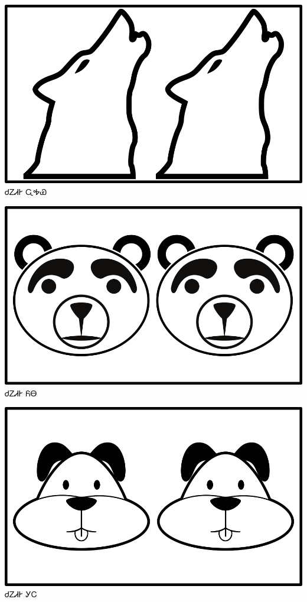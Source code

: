 \documentclass[avery5371]{flashcards}%
\begin{document}
\begin{flashcard}{
\includegraphics[width=0.95\columnwidth,height=.51\columnwidth,keepaspectratio]{../artwork/objects-animate/anitali-wahya}
}\Huge ᏧᏃᏗᎨ ᏩᎭᏯ
\end{flashcard}

\begin{flashcard}{
\includegraphics[width=0.95\columnwidth,height=.51\columnwidth,keepaspectratio]{../artwork/objects-animate/anitali-yona}
}\Huge ᏧᏃᏗᎨ ᏲᎾ
\end{flashcard}

\begin{flashcard}{
\includegraphics[width=0.95\columnwidth,height=.51\columnwidth,keepaspectratio]{../artwork/objects-animate/anitali-gihli}
}\Huge ᏧᏃᏗᎨ ᎩᏟ
\end{flashcard}
\end{document}
